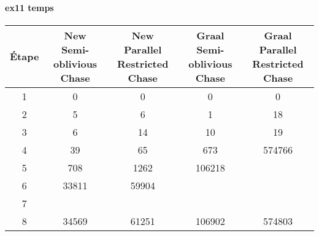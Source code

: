 \paragraph{ex11 temps}
\begin{center}
\begin{tabular}{|c||c|c|c|c|}
    \hline
    Étape & \shortstack{New \\ Semi-oblivious Chase} & \shortstack{New \\ Parallel Restricted Chase} & \shortstack{Graal \\ Semi-oblivious Chase} & \shortstack{Graal \\ Parallel Restricted Chase} \\
    \hline
     \hline
1&0&	0&					0&	0 \\
     \hline
2&5&	6&					1&	18\\
     \hline
3&6&	14&					10&	19\\
     \hline
4&39&	65&					673&	574766\\
     \hline
5&708&	1262&					106218 &	\\
     \hline
6&33811&	59904&			&			\\
     \hline
7&		&		&	&		\\
     \hline
8&34569&	61251&					106902&	574803\\
     \hline
\end{tabular}
\end{center}


